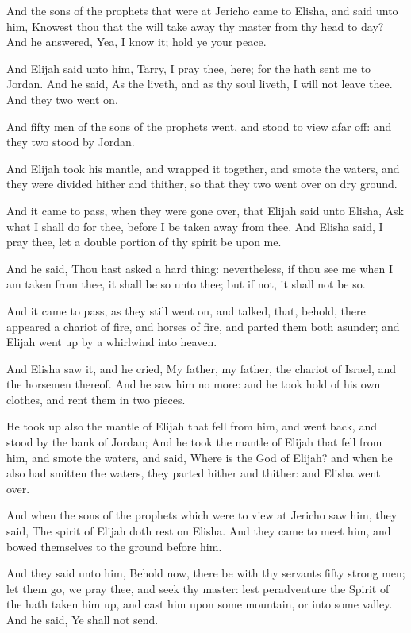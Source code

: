 \verse And the sons of the prophets that were at Jericho came to Elisha, and said unto him, Knowest thou that the \LORD will take away thy master from thy head to day? And he answered, Yea, I know it; hold ye your peace.

\verse And Elijah said unto him, Tarry, I pray thee, here; for the \LORD hath sent me to Jordan. And he said, As the \LORD liveth, and as thy soul liveth, I will not leave thee. And they two went on.

\verse And fifty men of the sons of the prophets went, and stood to view afar off: and they two stood by Jordan.

\verse And Elijah took his mantle, and wrapped it together, and smote the waters, and they were divided hither and thither, so that they two went over on dry ground.

\verse And it came to pass, when they were gone over, that Elijah said unto Elisha, Ask what I shall do for thee, before I be taken away from thee. And Elisha said, I pray thee, let a double portion of thy spirit be upon me.

\verse And he said, Thou hast asked a hard thing: nevertheless, if thou see me when I am taken from thee, it shall be so unto thee; but if not, it shall not be so.

\verse And it came to pass, as they still went on, and talked, that, behold, there appeared a chariot of fire, and horses of fire, and parted them both asunder; and Elijah went up by a whirlwind into heaven.

\verse And Elisha saw it, and he cried, My father, my father, the chariot of Israel, and the horsemen thereof. And he saw him no more: and he took hold of his own clothes, and rent them in two pieces.

\verse He took up also the mantle of Elijah that fell from him, and went back, and stood by the bank of Jordan; \verse And he took the mantle of Elijah that fell from him, and smote the waters, and said, Where is the \LORD God of Elijah? and when he also had smitten the waters, they parted hither and thither: and Elisha went over.

\verse And when the sons of the prophets which were to view at Jericho saw him, they said, The spirit of Elijah doth rest on Elisha. And they came to meet him, and bowed themselves to the ground before him.

\verse And they said unto him, Behold now, there be with thy servants fifty strong men; let them go, we pray thee, and seek thy master: lest peradventure the Spirit of the \LORD hath taken him up, and cast him upon some mountain, or into some valley. And he said, Ye shall not send.

